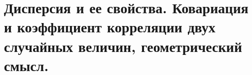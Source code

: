 \section{Дисперсия и ее свойства. Ковариация и коэффициент корреляции двух случайных величин, геометрический смысл.}